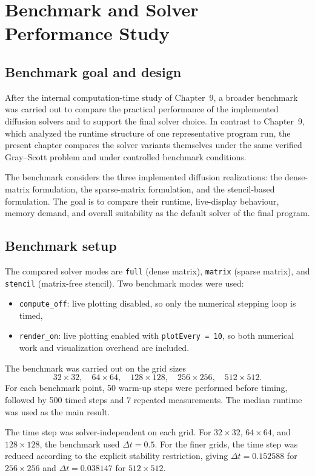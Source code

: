 \chapter{Benchmark and Solver Performance Study}

\section{Benchmark goal and design}

After the internal computation-time study of Chapter~9, a broader benchmark was carried out to compare the practical performance of the implemented diffusion solvers and to support the final solver choice. In contrast to Chapter~9, which analyzed the runtime structure of one representative program run, the present chapter compares the solver variants themselves under the same verified Gray--Scott problem and under controlled benchmark conditions.

The benchmark considers the three implemented diffusion realizations: the dense-matrix formulation, the sparse-matrix formulation, and the stencil-based formulation. The goal is to compare their runtime, live-display behaviour, memory demand, and overall suitability as the default solver of the final program.

\section{Benchmark setup}

The compared solver modes are \texttt{full} (dense matrix), \texttt{matrix} (sparse matrix), and \texttt{stencil} (matrix-free stencil). Two benchmark modes were used:
\begin{itemize}
    \item \texttt{compute\_off}: live plotting disabled, so only the numerical stepping loop is timed,
    \item \texttt{render\_on}: live plotting enabled with \texttt{plotEvery = 10}, so both numerical work and visualization overhead are included.
\end{itemize}

The benchmark was carried out on the grid sizes
\[
32\times 32,\quad 64\times 64,\quad 128\times 128,\quad 256\times 256,\quad 512\times 512.
\]
For each benchmark point, 50 warm-up steps were performed before timing, followed by 500 timed steps and 7 repeated measurements. The median runtime was used as the main result.

The time step was solver-independent on each grid. For \(32\times32\), \(64\times64\), and \(128\times128\), the benchmark used \(\Delta t = 0.5\). For the finer grids, the time step was reduced according to the explicit stability restriction, giving \(\Delta t = 0.152588\) for \(256\times256\) and \(\Delta t = 0.038147\) for \(512\times512\).

